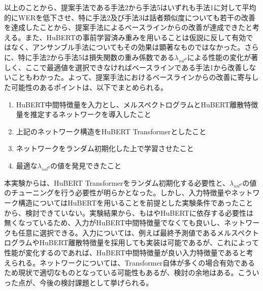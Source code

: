 \documentclass[12pt]{jarticle}
\numberwithin{equation}{section}    %
\numberwithin{figure}{section}      %
\numberwithin{table}{section}      %
\begin{document}
以上のことから、提案手法である手法2から手法5はいずれも手法1に対して平均的にWERを低下させ、特に手法2及び手法3は話者類似度についても若干の改善を達成したことから、提案手法によるベースラインからの改善が達成できたと考える。また、HuBERTの事前学習済み重みを用いることは仮説に反して有効ではなく、アンサンブル手法についてもその効果は顕著なものではなかった。さらに、特に手法2から手法5は損失関数の重み係数である$\lambda_{ssl^{d}}$による性能の変化が著しく、ここで最適値を選択できなければベースラインである手法1から改善しないこともわかった。よって、提案手法におけるベースラインからの改善に寄与した可能性のあるポイントは、以下でまとめられる。
\begin{enumerate}
    \item HuBERT中間特徴量を入力とし、メルスペクトログラムとHuBERT離散特徴量を推定するネットワークを導入したこと
    \item 上記のネットワーク構造をHuBERT Transformerとしたこと
    \item ネットワークをランダム初期化した上で学習させたこと
    \item 最適な$\lambda_{ssl^{d}}$の値を発見できたこと
\end{enumerate}
本実験からは、HuBERT Transformerをランダム初期化する必要性と、$\lambda_{ssl^{d}}$の値のチューニングを行う必要性が明らかとなった。しかし、入力特徴量やネットワーク構造についてはHuBERTを用いることを前提とした実験条件であったことから、検討できていない。実験結果から、もはやHuBERTに依存する必要性は無くなっているため、入力がHuBERT中間特徴量でなくても良いし、ネットワークも任意に選択できる。入力については、例えば最終予測値であるメルスペクトログラムやHuBERT離散特徴量を採用しても実装は可能であるが、これによって性能が変化するのであれば、HuBERT中間特徴量が良い入力特徴量であると考えられる。ネットワークについては、Transformer自体が多くの場合有効であるため現状で適切なものとなっている可能性もあるが、検討の余地はある。こういった点が、今後の検討課題として挙げられる。
\end{document}

